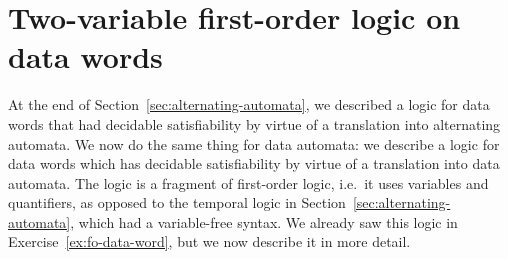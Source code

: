 

\section{Two-variable first-order logic on data words}
\label{sec:fo2}
At the end of Section~\ref{sec:alternating-automata}, we described a logic for data words that had decidable satisfiability by virtue of a translation into alternating automata. We now do the same thing for data automata: we describe a logic for data words which has decidable satisfiability by virtue of a translation into data automata. The logic is a fragment of first-order logic, i.e.~it uses variables and quantifiers, as opposed to the temporal logic in Section~\ref{sec:alternating-automata}, which had a variable-free syntax. We already saw this logic in Exercise~\ref{ex:fo-data-word}, but we now describe it in more detail. 

